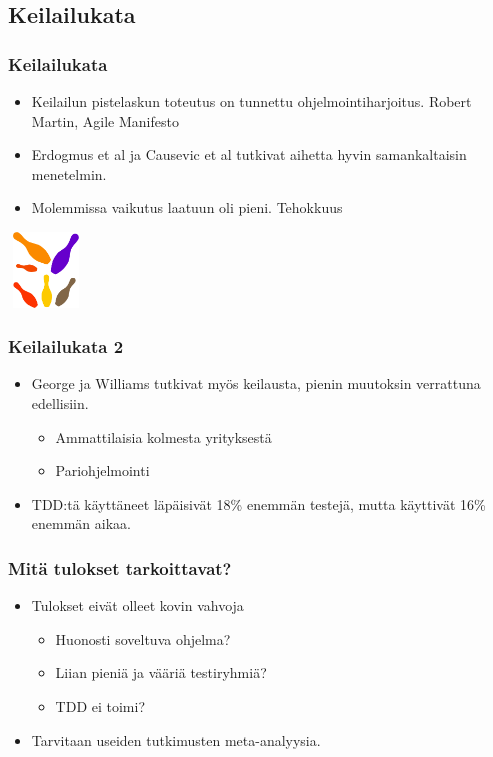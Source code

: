 \documentclass{beamer}
\begin{document}
\subsection{Keilailukata}

\begin{frame}
    	\frametitle{Keilailukata}
	\begin{itemize}
	\item Keilailun pistelaskun toteutus on tunnettu ohjelmointiharjoitus. Robert Martin, Agile Manifesto
	\item Erdogmus et al ja Causevic et al tutkivat aihetta hyvin samankaltaisin menetelmin.
	\item Molemmissa vaikutus laatuun oli pieni. Tehokkuus 
	\end{itemize}
\includegraphics[width=2cm,height=2cm]{keilat.png}

\end{frame}

\begin{frame}
    	\frametitle{Keilailukata 2}
	\begin{itemize}
	\item George ja Williams tutkivat myös keilausta, pienin muutoksin verrattuna edellisiin.
		\begin{itemize}
		\item Ammattilaisia kolmesta yrityksestä
		\item Pariohjelmointi
		\end{itemize}
	\item TDD:tä käyttäneet läpäisivät 18\% enemmän testejä, mutta käyttivät 16\% enemmän aikaa.

	\end{itemize}

\end{frame}

\begin{frame}
    	\frametitle{Mitä tulokset tarkoittavat?}
	\begin{itemize}
	\item Tulokset eivät olleet kovin vahvoja
		\begin{itemize}
		\item Huonosti soveltuva ohjelma?
		\item Liian pieniä ja vääriä testiryhmiä?
	 	\item TDD ei toimi?
		\end{itemize}
	\item Tarvitaan useiden tutkimusten meta-analyysia.
	\end{itemize}

\end{frame}
\end{document}
